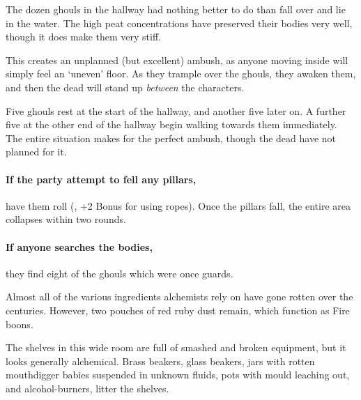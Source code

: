 
The dozen ghouls in the hallway had nothing better to do than fall over and lie in the water.
The high peat concentrations have preserved their bodies very well, though it does make them very stiff.

This creates an unplanned (but excellent) ambush, as anyone moving inside will simply feel an `uneven' floor.
As they trample over the ghouls, they awaken them, and then the dead will stand up \emph{between} the characters.

Five ghouls rest at the start of the hallway, and another five later on.
A further five at the other end of the hallway begin walking towards them immediately.
The entire situation makes for the perfect ambush, though the dead have not planned for it.

\paragraph{If the party attempt to fell any pillars,}
have them roll  (\tn[13], +2 Bonus for using ropes).
Once the pillars fall, the entire area collapses within two rounds.

\paragraph{If anyone searches the bodies,}
they find eight of the ghouls which were once \glspl{guard}.

\bookInvestigationChart[b]




Almost all of the various \glspl{ingredient} alchemists rely on have gone rotten over the centuries.
However, two pouches of red ruby dust remain, which function as Fire \glspl{boon}.

\begin{boxtext}
  The shelves in this wide room are full of smashed and broken equipment, but it looks generally alchemical.
  Brass beakers, glass beakers, jars with rotten mouthdigger babies suspended in unknown fluids, pots with mould leaching out, and alcohol-burners, litter the shelves.
\end{boxtext}

